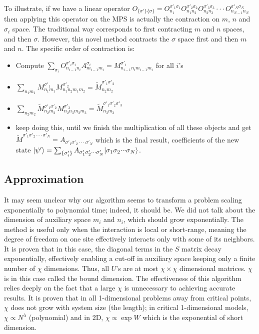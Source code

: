 \documentclass[english]{article}
\begin{document}
To illustrate, if we have a linear operator $O_{\{\sigma'\}\{\sigma\}}=O_{n_{1}}^{\sigma'_{1}\sigma_{1}}O_{n_{1}n_{2}}^{\sigma'_{2}\sigma_{2}}O_{n_{2}n_{3}}^{\sigma'_{3}\sigma_{3}}\cdot\cdot\cdot O_{n_{N-1}n_{N}}^{\sigma'_{N}\sigma_{N}}$
then applying this operator on the MPS is actually the contraction
on $m$, $n$ and $\sigma_{i}$ space. The traditional way corresponds
to first contracting $m$ and $n$ spaces, and then $\sigma$. However, this
novel method contracts the $\sigma$ space first and then $m$ and
$n$. The specific order of contraction is:
\begin{itemize}
\item Compute $\sum_{\sigma_{i}}O_{n_{i-1}n_{i}}^{\sigma'_{i}\sigma_{i}}A_{m_{i-1}m_{i}}^{\sigma_{i}}=M_{n_{i-1}n_{i}m_{i-1}m_{i}}^{\sigma'_{i}}$
for all $i$'s
\item $\sum_{n_{1}m_{1}}M_{n_{1}m_{1}}^{\sigma'_{1}}M_{n_{1}n_{2}m_{1}m_{2}}^{\sigma'_{2}}=\tilde{M}_{n_{2}m_{2}}^{\sigma'_{1}\sigma'_{2}}$
\item $\sum_{n_{2}m_{2}}\tilde{M}{}_{n_{2}m_{2}}^{\sigma'_{1}\sigma'_{2}}M_{n_{2}n_{3}m_{2}m_{3}}^{\sigma'_{3}}=\tilde{M}_{n_{3}m_{3}}^{\sigma'_{1}\sigma'_{2}\sigma'_{3}}$
\item keep doing this, until we finish the multiplication of all these objects
and get $\tilde{M}^{\sigma'_{1}\sigma'_{2}\cdot\cdot\cdot\sigma'_{N}}=A_{\sigma'_{1}\sigma'_{2}\cdot\cdot\cdot\sigma'_{N}}$
which is the final result, coefficients of the new state $|\psi'\rangle=\sum_{\{\sigma'_{i}\}}A_{\sigma'_{1}\sigma'_{2}\cdot\cdot\cdot\sigma'_{N}}|\sigma_{1}\sigma_{2}\text{\ensuremath{\cdot}}\text{\ensuremath{\cdot}}\text{\ensuremath{\cdot}}\sigma_{N}\rangle$.
\end{itemize}



\subsection{Approximation}

It may seem unclear why our algorithm seems to transform a
 problem scaling exponentially to polynomial time; indeed, it should be.
We did not talk about the dimension of auxiliary space $m_{i}$ and
$n_{i}$, which should grow exponentially. The method is useful
only when the interaction is local or short-range, meaning the
degree of freedom on one site  effectively interacts only with some
of its neighbors. It is proven that in this case, the diagonal terms
in the $S$ matrix decay exponentially, effectively enabling a cut-off
in auxiliary space keeping only a finite number of $\chi$ dimensions. Thus, all $U$'s are at most $\chi\times\chi$ dimensional matrices.
$\chi$ is in this case called the bound dimension. The effectiveness of this algorithm
relies deeply on the fact that a large $\chi$ is unnecessary to achieving accurate
results. It is proven that in all 1-dimensional problems away from critical
points, $\chi$ does not grow with system size (the length); in critical
1-dimensional models, $\chi\propto N^{\lambda}$ (polynomial) and
in 2D, $\chi\propto\exp W$ which is the exponential of short dimension.
\end{document}
